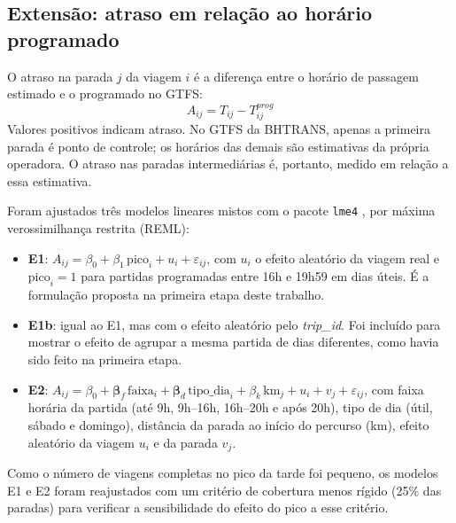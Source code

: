 \subsection{Extensão: atraso em relação ao horário programado}

O atraso na parada $j$ da viagem $i$ é a diferença entre o horário de passagem estimado e o
programado no GTFS:
\begin{equation}
A_{ij} = T_{ij} - T^{prog}_{ij}
\end{equation}
Valores positivos indicam atraso. No GTFS da BHTRANS, apenas a primeira parada é ponto de
controle; os horários das demais são estimativas da própria operadora. O atraso nas paradas
intermediárias é, portanto, medido em relação a essa estimativa.

Foram ajustados três modelos lineares mistos com o pacote \texttt{lme4} \cite{bates2015}, por
máxima verossimilhança restrita (REML):

\begin{itemize}
  \item \textbf{E1}: $A_{ij} = \beta_0 + \beta_1\,\mathrm{pico}_i + u_i + \varepsilon_{ij}$,
        com $u_i$ o efeito aleatório da viagem real e $\mathrm{pico}_i = 1$ para partidas
        programadas entre 16h e 19h59 em dias úteis. É a formulação proposta na primeira etapa
        deste trabalho.
  \item \textbf{E1b}: igual ao E1, mas com o efeito aleatório pelo \textit{trip\_id}. Foi
        incluído para mostrar o efeito de agrupar a mesma partida de dias diferentes, como
        havia sido feito na primeira etapa.
  \item \textbf{E2}: $A_{ij} = \beta_0 + \boldsymbol{\beta}_f\,\mathrm{faixa}_i +
        \boldsymbol{\beta}_d\,\mathrm{tipo\_dia}_i + \beta_k\,\mathrm{km}_{j} + u_i + v_j +
        \varepsilon_{ij}$, com faixa horária da partida (até 9h, 9h--16h, 16h--20h e após
        20h), tipo de dia (útil, sábado e domingo), distância da parada ao início do percurso
        (km), efeito aleatório da viagem $u_i$ e da parada $v_j$.
\end{itemize}

Como o número de viagens completas no pico da tarde foi pequeno, os modelos E1 e E2 foram
reajustados com um critério de cobertura menos rígido (25\% das paradas) para verificar a
sensibilidade do efeito do pico a esse critério.
